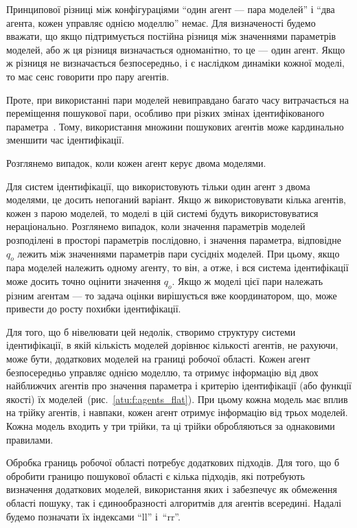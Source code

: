 Принципової різниці між конфігураціями ``один агент --- пара моделей''
і ``два агента, кожен управляє однією моделлю''
немає. Для визначеності будемо вважати, що якщо підтримується
постійна різниця між значеннями параметрів моделей, або ж ця
різниця визначається одноманітно, то це --- один агент. Якщо ж
різниця не визначається безпосередньо, і є наслідком динаміки
кожної моделі, то має сенс говорити про пару агентів.

Проте, при використанні пари моделей невиправдано багато часу
витрачається на переміщення пошукової пари, особливо при різких
змінах ідентифікованого параметра~\cite{atu_asau23}.
Тому, використання множини
пошукових агентів може кардинально зменшити час ідентифікації.


Розглянемо випадок, коли кожен агент
керує двома моделями.

Для систем ідентифікації, що використовують тільки один
агент з двома моделями, це досить непоганий варіант. Якщо ж
використовувати кілька агентів, кожен з парою моделей,
то моделі в цій системі будуть використовуватися
нераціонально. Розглянемо випадок, коли значення параметрів
моделей розподілені в просторі параметрів послідовно, і
значення параметра, відповідне
$ q_o $ лежить між значеннями параметрів пари сусідніх моделей. При
цьому, якщо пара моделей належить одному агенту, то він, а отже,
і вся система ідентифікації може досить точно оцінити значення
$ q_o $.
Якщо ж моделі цієї пари належать різним агентам ---
то задача оцінки вирішується вже координатором,
що, може привести до росту похибки ідентифікації.

Для того, що б нівелювати цей недолік, створимо структуру системи
ідентифікації, в якій кількість моделей дорівнює кількості
агентів, не рахуючи, може бути, додаткових моделей на границі
робочої області.
Кожен агент безпосередньо управляє однією моделлю,
та отримує інформацію від двох найближчих агентів
про значення параметра і критерію ідентифікації
(або функції якості) їх моделей~(рис.~\ref{atu:f:agents_flat}).
При цьому кожна модель має вплив на трійку агентів,
і навпаки, кожен агент отримує інформацію від трьох моделей.
Кожна модель входить у три трійки, та ці трійки обробляються за
однаковими правилами.


Обробка границь робочої області потребує додаткових підходів.
Для того, що б обробити границю
пошукової області є кілька підходів, які потребують визначення
додаткових моделей, використання яких і забезпечує як обмеження
області пошуку, так і єдинообразності алгоритмів для агентів
всередині. Надалі будемо позначати їх індексами ``ll'' і~``rr''.

